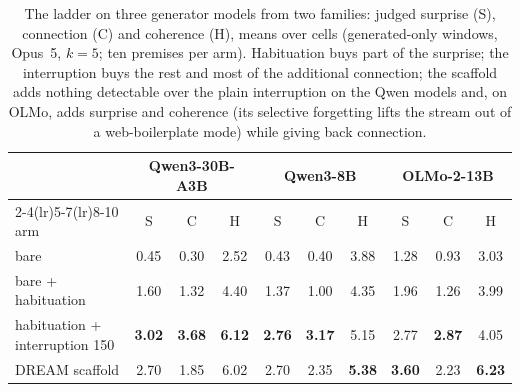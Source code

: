 \begin{table}[t]
\centering\small
\begin{tabular}{@{}lccc@{\hspace{1.2em}}ccc@{\hspace{1.2em}}ccc@{}}
\toprule
& \multicolumn{3}{c}{Qwen3-30B-A3B} & \multicolumn{3}{c}{Qwen3-8B} & \multicolumn{3}{c}{OLMo-2-13B} \\
\cmidrule(lr){2-4}\cmidrule(lr){5-7}\cmidrule(lr){8-10}
arm & S & C & H & S & C & H & S & C & H \\
\midrule
bare & 0.45 & 0.30 & 2.52 & 0.43 & 0.40 & 3.88 & 1.28 & 0.93 & 3.03 \\
bare + habituation & 1.60 & 1.32 & 4.40 & 1.37 & 1.00 & 4.35 & 1.96 & 1.26 & 3.99 \\
habituation + interruption 150 & \textbf{3.02} & \textbf{3.68} & \textbf{6.12} & \textbf{2.76} & \textbf{3.17} & 5.15 & 2.77 & \textbf{2.87} & 4.05 \\
DREAM scaffold & 2.70 & 1.85 & 6.02 & 2.70 & 2.35 & \textbf{5.38} & \textbf{3.60} & 2.23 & \textbf{6.23} \\
\bottomrule
\end{tabular}
\caption{The ladder on three generator models from two families: judged
surprise (S), connection (C) and coherence (H), means over cells
(generated-only windows, Opus~5, $k=5$; ten premises per arm). Habituation
buys part of the surprise; the interruption buys the rest and most of the
additional connection; the scaffold adds nothing detectable over the plain
interruption on the Qwen models and, on OLMo, adds surprise and coherence
(its selective forgetting lifts the stream out of a web-boilerplate mode)
while giving back connection.}
\label{tab:ladder}
\end{table}

